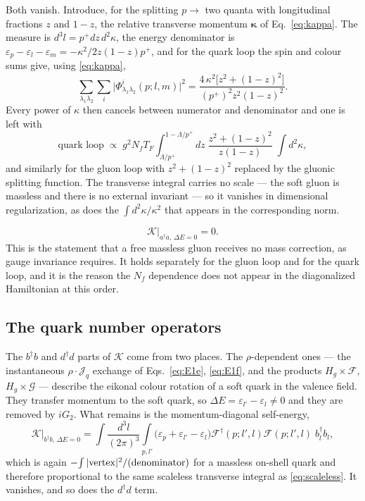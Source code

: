 \documentclass[11pt]{article}
\newcommand{\eps}{\varepsilon}
\newcommand{\dg}{\dagger}
\newcommand{\ip}[1]{\int\!\frac{d^{3}#1}{(2\pi)^{3}}}
\newcommand{\Ph}{\Phi}
\newcommand{\Jc}{\mathcal{J}}
\newcommand{\Lam}{\Lambda}
\begin{document}
Both vanish. Introduce, for the splitting $p\to$ two quanta with longitudinal fractions $z$ and
$1-z$, the relative transverse momentum $\bm\kappa$ of Eq.~\eqref{eq:kappa}. The measure is
$d^{3}l=p^{+}dz\,d^{2}\kappa$, the energy denominator is
$\eps_{p}-\eps_{l}-\eps_{m}=-\kappa^{2}/2z(1-z)p^{+}$, and for the quark loop the spin and colour
sums give, using \eqref{eq:kappa},
\begin{equation}
\sum_{\lambda_{1}\lambda_{2}}\sum_{i}\big|\Ph^{i}_{\lambda_{1}\lambda_{2}}(p;l,m)\big|^{2}
=\frac{4\,\kappa^{2}\big[z^{2}+(1-z)^{2}\big]}{(p^{+})^{2}z^{2}(1-z)^{2}} .
\end{equation}
Every power of $\kappa$ then cancels between numerator and denominator and one is left with
\begin{equation}
\text{quark loop}\;\propto\;g^{2}N_{f}T_{F}\int_{\Lam/p^{+}}^{1-\Lam/p^{+}}\!\!dz\;
\frac{z^{2}+(1-z)^{2}}{z(1-z)}\;\int\! d^{2}\kappa ,
\label{eq:scaleless}
\end{equation}
and similarly for the gluon loop with $z^{2}+(1-z)^{2}$ replaced by the gluonic splitting
function. The transverse integral carries no scale --- the soft gluon is massless and there is no
external invariant --- so it vanishes in dimensional regularization, as does the
$\int d^{2}\kappa/\kappa^{2}$ that appears in the corresponding norm.
\begin{res}
\begin{equation}
\mathcal K\Big|_{a^{\dg}a,\,\Delta E=0}=0 .
\label{eq:loopzero}
\end{equation}
This is the statement that a free massless gluon receives no mass correction, as gauge invariance
requires. It holds separately for the gluon loop and for the quark loop, and it is the reason the
$N_{f}$ dependence does not appear in the diagonalized Hamiltonian at this order.
\end{res}

\subsection{The quark number operators}

The $b^{\dg}b$ and $d^{\dg}d$ parts of $\mathcal K$ come from two places. The $\rho$-dependent
ones --- the instantaneous $\rho\!\cdot\!\Jc_{q}$ exchange of Eqs.~\eqref{eq:E1e},
\eqref{eq:E1f}, and the products $H_{g}\times\mathcal F$, $H_{g}\times\mathcal G$ --- describe the
eikonal colour rotation of a soft quark in the valence field. They transfer momentum to the soft
quark, so $\Delta E=\eps_{l'}-\eps_{l}\neq0$ and they are removed by $iG_{2}$. What remains is the
momentum-diagonal self-energy,
\begin{equation}
\mathcal K\Big|_{b^{\dg}b,\,\Delta E=0}
=\ip{l}\int\limits_{p,l'}\big(\eps_{p}+\eps_{l'}-\eps_{l}\big)
\mathcal F^{\dg}(p;l',l)\mathcal F(p;l',l)\;b^{\dg}_{l}b_{l},
\end{equation}
which is again $-\!\int|{\rm vertex}|^{2}/({\rm denominator})$ for a massless on-shell quark and
therefore proportional to the same scaleless transverse integral as \eqref{eq:scaleless}. It
vanishes, and so does the $d^{\dg}d$ term.
\end{document}
